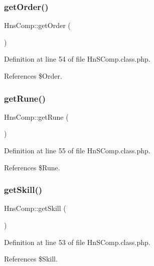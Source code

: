 \subsubsection{\texorpdfstring{get\+Order()}{getOrder()}}
{\footnotesize\ttfamily Hns\+Comp\+::get\+Order (\begin{DoxyParamCaption}{ }\end{DoxyParamCaption})}



Definition at line 54 of file Hn\+S\+Comp.\+class.\+php.



References \$\+Order.

\mbox{\label{class_hns_comp_a8dfd5e7ff9223a0ee17da5f691f5c843}} 
\subsubsection{\texorpdfstring{get\+Rune()}{getRune()}}
{\footnotesize\ttfamily Hns\+Comp\+::get\+Rune (\begin{DoxyParamCaption}{ }\end{DoxyParamCaption})}



Definition at line 55 of file Hn\+S\+Comp.\+class.\+php.



References \$\+Rune.

\mbox{\label{class_hns_comp_a3dd86b7da57237f33e155ee145ee3d8c}} 
\subsubsection{\texorpdfstring{get\+Skill()}{getSkill()}}
{\footnotesize\ttfamily Hns\+Comp\+::get\+Skill (\begin{DoxyParamCaption}{ }\end{DoxyParamCaption})}



Definition at line 53 of file Hn\+S\+Comp.\+class.\+php.



References \$\+Skill.

\mbox{\label{class_hns_comp_a9222ea4e7c469d7c7596d649d1128cc0}} 
